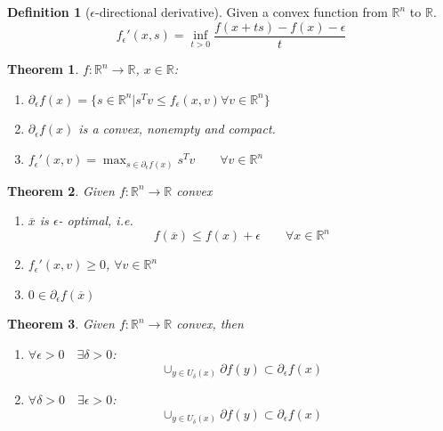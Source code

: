\documentclass[a4paper,11pt,fleqn, draft]{book}
\newtheorem{theorem}{Theorem}[section]
\theoremstyle{definition}
\newtheorem{definition}{Definition}[section]
\theoremstyle{remark}
\begin{document}
\begin{definition}[$\epsilon$-directional derivative]
Given a convex function from $\mathbb{R}^n$ to $\mathbb{R}$. 
\begin{equation*}
	f_\epsilon'(x, s) = \inf_{t > 0} \frac{f(x + ts) - f(x) - \epsilon}{t}
\end{equation*}
\end{definition}



\begin{theorem}
	$f: \mathbb{R}^n \rightarrow \mathbb{R}$, $x \in \mathbb{R}$:
\begin{enumerate}
	\item $\partial_\epsilon f(x) = \{ s \in \mathbb{R}^n | s^T v  \leq f_\epsilon(x, v) \forall v \in \mathbb{R}^n\}$
	\item $\partial_\epsilon f(x)$ is a convex, nonempty and compact.
	\item $f_\epsilon'(x, v) = \max_{s \in \partial_\epsilon f(x)} s^T v \qquad \forall v \in \mathbb{R}^n$
\end{enumerate}
\end{theorem}

\begin{theorem}
Given $f: \mathbb{R}^n \rightarrow \mathbb{R}$ convex 
\begin{enumerate}
	\item $\overline{x}$ is $\epsilon$- optimal, i.e.
	\begin{equation*}
		f(\overline{x}) \leq f(x) + \epsilon \qquad \forall x \in \mathbb{R}^n
	\end{equation*}
	\item $f_\epsilon'(x, v) \geq 0$, $\forall v \in \mathbb{R}^n$
	\item $0 \in \partial_\epsilon f(\overline{x})$
\end{enumerate}
\end{theorem}

\begin{theorem}
Given $f: \mathbb{R}^n \rightarrow \mathbb{R}$ convex, then 
\begin{enumerate}
	\item $\forall \epsilon > 0 \quad \exists \delta > 0$:
	\begin{equation*}
		\cup_{y \in U_\delta(x)} \partial f(y) \subset \partial_\epsilon f(x)
	\end{equation*}
	\item $\forall \delta > 0 \quad \exists \epsilon > 0$:
	\begin{equation*}
		\cup_{y \in U_\delta(x)} \partial f(y) \subset \partial_\epsilon f(x)
	\end{equation*}
\end{enumerate}
\end{theorem}
\end{document}
